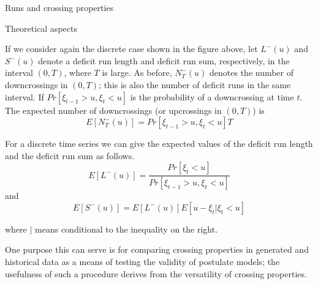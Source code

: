 \documentclass[8pt]{beamer}
\renewcommand{\emph}[1]{\textcolor{myorange}{#1}}
\begin{document}
 \begin{frame}{Runs and crossing properties}
    \begin{block}{Theoretical aspects}
    \end{block}
    If we consider again the discrete case shown in the figure above, let $L^{-} (u)$ and $S^{-} (u)$ denote a deficit \emph{run length } and deficit \emph{run sum}, respectively, in the interval $(0,T)$, where $T$ is large. As before, $N^{-}_T (u)$ denotes the number of downcrossings in $(0, T)$; this is also the number of \emph{deficit runs} in the same interval. If $Pr[\xi_{t-1} > u, \xi_t < u]$ is the probability of a \emph{downcrossing} at time $t$. The expected number of \emph{downcrossings} (or \emph{upcrossings} in $(0,T)$) is
\begin{equation}
    E[N_T^- (u)] = Pr[\xi_{t-1} > u, \xi_t < u] T
    \label{e53}
\end{equation}

For a discrete time series we can give the expected values of the \emph{deficit run length} and the \emph{deficit run sum} as follows.
\begin{equation}
    E[L^- (u)] = \frac{Pr[\xi_t < u]}{Pr[\xi_{t-1} > u, \xi_t < u]}
    \label{e54}
\end{equation}
and 
\begin{equation}
    E[S^- (u)] = E[L^- (u)] E[u-\xi_t | \xi_t  < u]
    \label{e55}
\end{equation}

where $|$ means conditional  to the inequality on the right. 

One purpose this can serve  is for comparing \emph{crossing properties} in generated and historical data as a means of testing the \emph{validity of postulate models}; the usefulness of such a procedure derives from the versatility of crossing properties. 
\end{frame}
\end{document}
